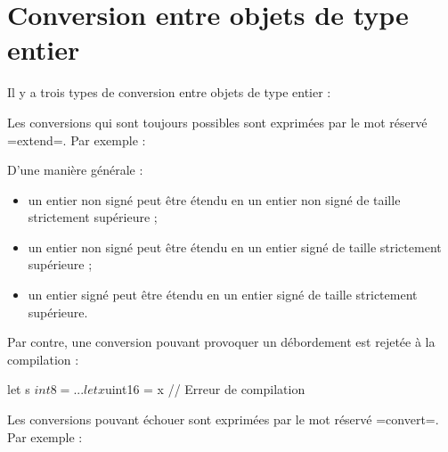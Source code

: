 \section{Conversion entre objets de type entier}

Il y a trois types de conversion entre objets de type entier :



Les conversions qui sont toujours possibles sont exprimées par le mot réservé \plm=extend=. Par exemple :

D'une manière générale :
\begin{itemize}
\item un entier non signé peut être étendu en un entier non signé de taille strictement supérieure ;
\item un entier non signé peut être étendu en un entier signé de taille strictement supérieure ;
\item un entier signé peut être étendu en un entier signé de taille strictement supérieure.
\end{itemize}

Par contre, une conversion pouvant provoquer un débordement est rejetée à la compilation :
\begin{PLM}
let s $int8 = ...
let x $uint16 = x // Erreur de compilation
\end{PLM}





Les conversions pouvant échouer sont exprimées par le mot réservé \plm=convert=. Par exemple :

